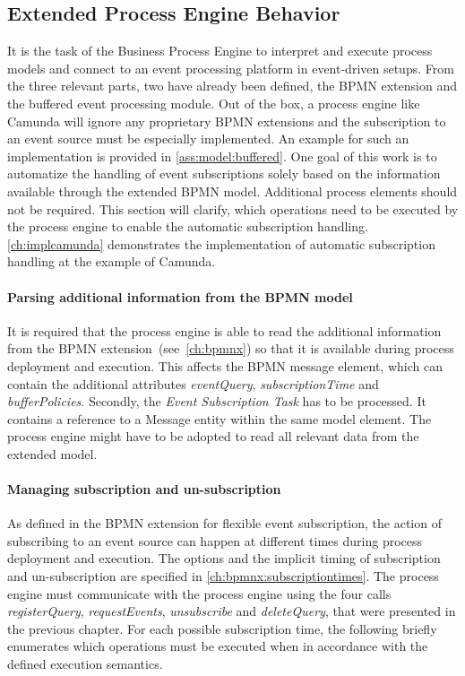 \subsection{Extended Process Engine Behavior}\label{ch:extendedprocessengine}
It is the task of the Business Process Engine to interpret and execute process models and connect to an event processing platform in event-driven setups.
From the three relevant parts, two have already been defined, the BPMN extension and the buffered event processing module.
Out of the box, a process engine like Camunda will ignore any proprietary BPMN extensions and the subscription to an event source must be especially implemented. An example for such an implementation is provided in \autoref{ass:model:buffered}.
One goal of this work is to automatize the handling of event subscriptions solely based on the information available through the extended BPMN model. Additional process elements should not be required.
This section will clarify, which operations need to be executed by the process engine to enable the automatic subscription handling.
\autoref{ch:implcamunda} demonstrates the implementation of automatic subscription handling at the example of Camunda.

\paragraph{Parsing additional information from the BPMN model}
It is required that the process engine is able to read the additional information from the BPMN extension~(see~\autoref{ch:bpmnx}) so that it is available during process deployment and execution.
This affects the BPMN message element, which can contain the additional attributes \textit{eventQuery}, \textit{subscriptionTime} and \textit{bufferPolicies}.
Secondly, the \textit{Event Subscription Task} has to be processed. It contains a reference to a Message entity within the same model element.
The process engine might have to be adopted to read all relevant data from the extended model.


\paragraph{Managing subscription and un-subscription}
As defined in the BPMN extension for flexible event subscription, the action of subscribing to an event source can happen at different times during process deployment and execution. The options and the implicit timing of subscription and un-subscription are specified in \autoref{ch:bpmnx:subscriptiontimes}.
The process engine must communicate with the process engine using the four calls \textit{registerQuery}, \textit{requestEvents}, \textit{unsubscribe} and \textit{deleteQuery}, that were presented in the previous chapter.
For each possible subscription time, the following briefly enumerates which operations must be executed when in accordance with the defined execution semantics. 

